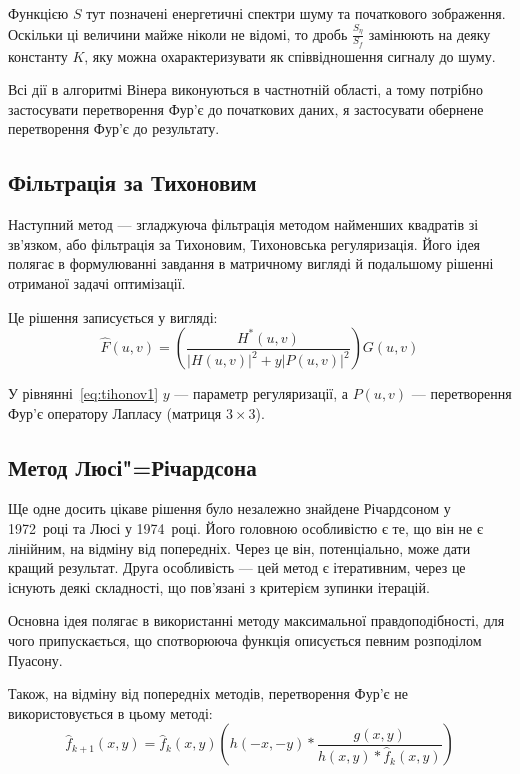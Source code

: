 \documentclass{diploma}
\begin{document}
      Функцією $S$ тут позначені енергетичні спектри шуму та початкового
      зображення.
      Оскільки ці величини майже ніколи не відомі, то дробь
      $\frac{S_\eta}{S_f}$ замінюють на деяку константу $K$, яку можна
      охарактеризувати як співвідношення сигналу до шуму.

      Всі дії в алгоритмі Вінера виконуються в частнотній області, а тому
      потрібно застосувати перетворення Фур’є до початкових даних, я
      застосувати обернене перетворення Фур’є до результату.
      \clearpage
    \subsection{Фільтрація за Тихоновим}
      Наступний метод --- згладжуюча фільтрація методом найменших
      квадратів зі зв’язком, або фільтрація за Тихоновим,
      Тихоновська регуляризація.
      Його ідея полягає в формулюванні завдання в матричному вигляді й
      подальшому рішенні отриманої задачі оптимізації.

      Це рішення записується у вигляді:
      \begin{equation}
        \hat{F}\left( u, v \right) = \left( \frac{H^\ast\left( u, v
        \right)}{\left|H\left( u, v \right)\right|^2 + y\left|P\left( u, v
        \right)\right|^2} \right) G\left( u, v \right)
        \label{eq:tihonov1}
      \end{equation}

      У рівнянні~\eqref{eq:tihonov1} $y$ --- параметр регуляризації, а
      $P\left( u, v \right)$ --- перетворення Фур’є оператору Лапласу (матриця
      $3\times3$).
      \clearpage
    \subsection{Метод Люсі"=Річардсона}
      Ще одне досить цікаве рішення було незалежно знайдене Річардсоном у
      1972~році та Люсі у 1974~році.
      Його головною особливістю є те, що він не є лінійним, на відміну від
      попередніх.
      Через це він, потенціально, може дати кращий результат.
      Друга особливість --- цей метод є ітеративним, через це існують деякі
      складності, що пов’язані з критерієм зупинки ітерацій.

      Основна ідея полягає в використанні методу максимальної
      правдоподібності, для чого припускається, що спотворююча функція
      описується певним розподілом Пуасону.

      Також, на відміну від попередніх методів, перетворення Фур’є не
      використовується в цьому методі:
      \begin{equation}
        \hat{f}_{k+1}\left( x, y \right) = \hat{f}_k \left( x, y \right)\left(
        h\left( -x, -y \right) \ast \frac{g\left( x, y \right)}{h\left( x, y
          \right) \ast \hat{f}_k\left( x, y \right)} \right)
        \label{eq:lr1}
      \end{equation}
\end{document}
